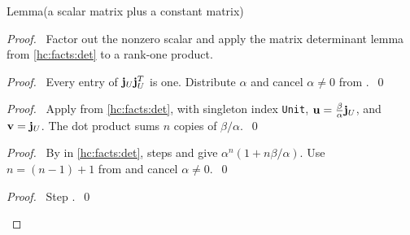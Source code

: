 \begin{mergedproofsection}
\begin{namedresult}{Lemma}{(a scalar matrix plus a constant matrix)}\label{hc:lem:det}
 \leavevmode\par
\end{namedresult}
\begin{proof}
 \pfsketch\ Factor out the nonzero scalar and apply the matrix
 determinant lemma from \ref{hc:facts:det} to a rank-one product.
 \begin{proof}\pf\ Every entry of ${\mathbf j}_U{\mathbf j}_U^T$ is one.
  Distribute $\alpha$ and cancel $\alpha\ne0$ from .~\qed\end{proof}
 \begin{proof}\pf\ Apply
  from \ref{hc:facts:det}, with singleton index \texttt{Unit},
  ${\mathbf u}=\tfrac\beta\alpha{\mathbf j}_U$, and ${\mathbf v}={\mathbf j}_U$.
  The dot product sums $n$ copies of $\beta/\alpha$.~\qed\end{proof}
 \begin{proof}\pf\ By  in \ref{hc:facts:det},
  steps  and  give
  $\alpha^n(1+n\beta/\alpha)$.
  Use $n=(n-1)+1$ from  and cancel $\alpha\ne0$.~\qed\end{proof}
 \qedstep
 \begin{proof}\pf\ Step .~\qed\end{proof}
\end{proof}


\end{mergedproofsection}
